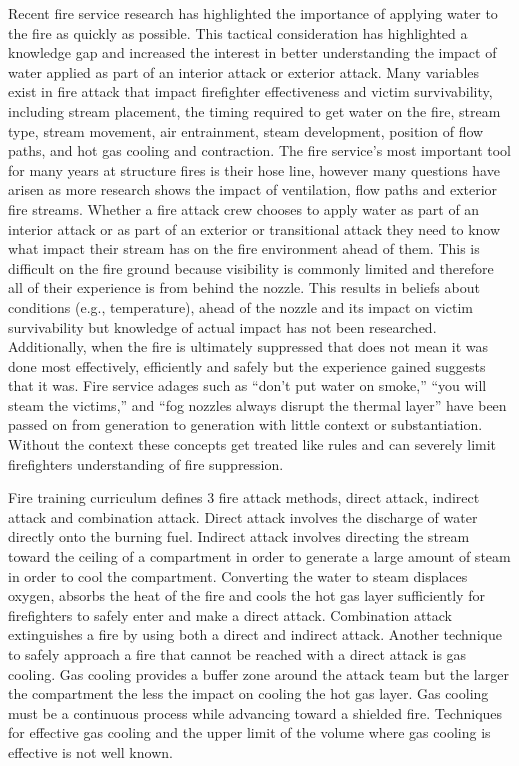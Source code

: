 \documentclass[12pt,oneside]{book}
\begin{document}
Recent fire service research has highlighted the importance of applying water to the fire as quickly as possible. This tactical consideration has highlighted a knowledge gap and increased the interest in better understanding the impact of water applied as part of an interior attack or exterior attack. Many variables exist in fire attack that impact firefighter effectiveness and victim survivability, including stream placement, the timing required to get water on the fire, stream type, stream movement, air entrainment, steam development, position of flow paths, and hot gas cooling and contraction. The fire service's most important tool for many years at structure fires is their hose line, however many questions have arisen as more research shows the impact of ventilation, flow paths and exterior fire streams. Whether a fire attack crew chooses to apply water as part of an interior attack or as part of an exterior or transitional attack they need to know what impact their stream has on the fire environment ahead of them. This is difficult on the fire ground because visibility is commonly limited and therefore all of their experience is from behind the nozzle. This results in beliefs about conditions (e.g., temperature), ahead of the nozzle and its impact on victim survivability but knowledge of actual impact has not been researched. Additionally, when the fire is ultimately suppressed that does not mean it was done most effectively, efficiently and safely but the experience gained suggests that it was. Fire service adages such as ``don’t put water on smoke,'' ``you will steam the victims,'' and ``fog nozzles always disrupt the thermal layer'' have been passed on from generation to generation with little context or substantiation. Without the context these concepts get treated like rules and can severely limit firefighters understanding of fire suppression.

Fire training curriculum defines 3 fire attack methods, direct attack, indirect attack and combination attack. Direct attack involves the discharge of water directly onto the burning fuel. Indirect attack involves directing the stream toward the ceiling of a compartment in order to generate a large amount of steam in order to cool the compartment. Converting the water to steam displaces oxygen, absorbs the heat of the fire and cools the hot gas layer sufficiently for firefighters to safely enter and make a direct attack. Combination attack extinguishes a fire by using both a direct and indirect attack. Another technique to safely approach a fire that cannot be reached with a direct attack is gas cooling. Gas cooling provides a buffer zone around the attack team but the larger the compartment the less the impact on cooling the hot gas layer. Gas cooling must be a continuous process while advancing toward a shielded fire. Techniques for effective gas cooling and the upper limit of the volume where gas cooling is effective is not well known.  
\end{document}
